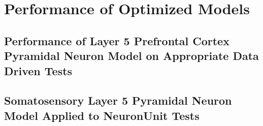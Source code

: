



%


\section{Performance of Optimized Models}
\subsection{Performance of Layer 5 Prefrontal Cortex Pyramidal Neuron Model on Appropriate Data Driven Tests}

\subsection{Somatosensory Layer 5 Pyramidal Neuron Model Applied to NeuronUnit Tests}

